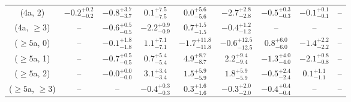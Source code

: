 \begin{table}[h!]
{\begin{tabular}{ccccccccc}
	(4a, 2) & $-0.2^{+ 0.2 }_{- 0.2 }$ & $-0.8^{+ 3.7 }_{- 3.7 }$ & $0.1^{+ 7.5 }_{- 7.5 }$ & $0.0^{+ 5.6 }_{- 5.6 }$ & $-2.7^{+ 2.8 }_{- 2.8 }$ & $-0.5^{+ 0.3 }_{- 0.3 }$ & $-0.1^{+ 0.1 }_{- 0.1 }$ & -- \\[0.5ex] 
	(4a, $\ge3$) & -- & $-0.6^{+ 0.5 }_{- 0.5 }$ & $-2.2^{+ 0.9 }_{- 0.9 }$ & $0.7^{+ 1.5 }_{- 1.5 }$ & $-0.4^{+ 1.2 }_{- 1.2 }$ & -- & -- & -- \\[0.5ex] 
	($\ge5$a, 0) & -- & $-0.1^{+ 1.8 }_{- 1.8 }$ & $1.1^{+ 7.1 }_{- 7.1 }$ & $-1.7^{+ 11.8 }_{- 11.8 }$ & $-0.6^{+ 12.5 }_{- 12.5 }$ & $0.8^{+ 6.0 }_{- 6.0 }$ & $-1.4^{+ 2.2 }_{- 2.2 }$ & -- \\[0.5ex] 
	($\ge5$a, 1) & -- & $-0.7^{+ 0.5 }_{- 0.5 }$ & $0.7^{+ 5.4 }_{- 5.4 }$ & $4.9^{+ 8.7 }_{- 8.7 }$ & $2.2^{+ 9.4 }_{- 9.4 }$ & $-1.3^{+ 4.0 }_{- 4.0 }$ & $-2.1^{+ 0.8 }_{- 0.8 }$ & -- \\[0.5ex] 
	($\ge5$a, 2) & -- & $-0.0^{+ 0.0 }_{- 0.0 }$ & $3.1^{+ 3.4 }_{- 3.4 }$ & $1.5^{+ 5.9 }_{- 5.9 }$ & $1.8^{+ 5.9 }_{- 5.9 }$ & $-0.5^{+ 2.4 }_{- 2.4 }$ & $0.1^{+ 1.1 }_{- 1.1 }$ & -- \\[0.5ex] 
	($\ge5$a, $\ge3$) & -- & -- & $-0.4^{+ 0.3 }_{- 0.3 }$ & $0.3^{+ 1.6 }_{- 1.6 }$ & $-0.3^{+ 2.0 }_{- 2.0 }$ & $-0.4^{+ 0.4 }_{- 0.4 }$ & -- & -- \\[0.5ex] 
	\hline
	\hline
\end{tabular}}
\end{table}
